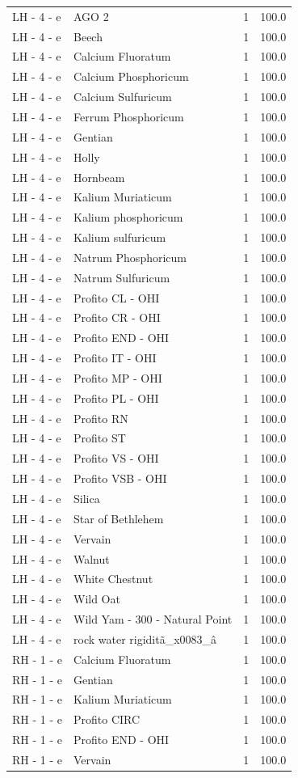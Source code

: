 \documentclass[a4paper,11pt]{article}
\begin{document}
\begin{footnotesize}
\begin{longtable}{p{3.5cm}p{7.5cm}rr}
LH - 4 - e & AGO 2 & 1 & 100.0 \\
LH - 4 - e & Beech & 1 & 100.0 \\
LH - 4 - e & Calcium Fluoratum & 1 & 100.0 \\
LH - 4 - e & Calcium Phosphoricum & 1 & 100.0 \\
LH - 4 - e & Calcium Sulfuricum & 1 & 100.0 \\
LH - 4 - e & Ferrum Phosphoricum & 1 & 100.0 \\
LH - 4 - e & Gentian & 1 & 100.0 \\
LH - 4 - e & Holly & 1 & 100.0 \\
LH - 4 - e & Hornbeam & 1 & 100.0 \\
LH - 4 - e & Kalium Muriaticum & 1 & 100.0 \\
LH - 4 - e & Kalium phosphoricum & 1 & 100.0 \\
LH - 4 - e & Kalium sulfuricum & 1 & 100.0 \\
LH - 4 - e & Natrum Phosphoricum & 1 & 100.0 \\
LH - 4 - e & Natrum Sulfuricum & 1 & 100.0 \\
LH - 4 - e & Profito CL - OHI & 1 & 100.0 \\
LH - 4 - e & Profito CR - OHI & 1 & 100.0 \\
LH - 4 - e & Profito END - OHI & 1 & 100.0 \\
LH - 4 - e & Profito IT - OHI & 1 & 100.0 \\
LH - 4 - e & Profito MP - OHI & 1 & 100.0 \\
LH - 4 - e & Profito PL - OHI & 1 & 100.0 \\
LH - 4 - e & Profito RN & 1 & 100.0 \\
LH - 4 - e & Profito ST & 1 & 100.0 \\
LH - 4 - e & Profito VS - OHI & 1 & 100.0 \\
LH - 4 - e & Profito VSB - OHI & 1 & 100.0 \\
LH - 4 - e & Silica & 1 & 100.0 \\
LH - 4 - e & Star of Bethlehem & 1 & 100.0 \\
LH - 4 - e & Vervain & 1 & 100.0 \\
LH - 4 - e & Walnut & 1 & 100.0 \\
LH - 4 - e & White Chestnut & 1 & 100.0 \\
LH - 4 - e & Wild Oat & 1 & 100.0 \\
LH - 4 - e & Wild Yam - 300  - Natural Point & 1 & 100.0 \\
LH - 4 - e & rock water rigiditã\_x0083\_â & 1 & 100.0 \\
RH - 1 - e & Calcium Fluoratum & 1 & 100.0 \\
RH - 1 - e & Gentian & 1 & 100.0 \\
RH - 1 - e & Kalium Muriaticum & 1 & 100.0 \\
RH - 1 - e & Profito CIRC & 1 & 100.0 \\
RH - 1 - e & Profito END - OHI & 1 & 100.0 \\
RH - 1 - e & Vervain & 1 & 100.0 \\
\end{longtable}
\end{footnotesize}
\end{document}
